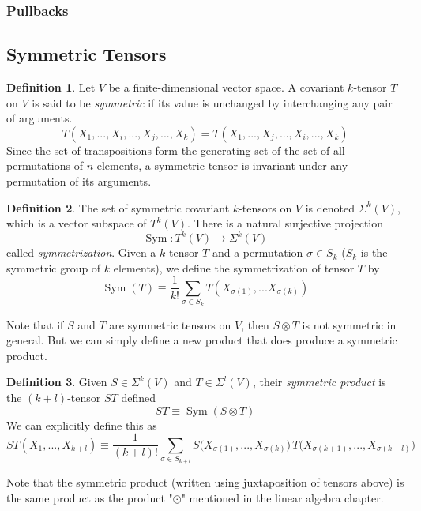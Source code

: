 \documentclass{article}
\DeclareMathOperator{\Sym}{Sym}
\theoremstyle{remark}
\theoremstyle{definition}
\newtheorem{definition}{Definition}[section]
\begin{document}
    \subsubsection{Pullbacks}

  \subsection{Symmetric Tensors}
    \begin{definition}
    Let $V$ be a finite-dimensional vector space. A covariant $k$-tensor $T$ on $V$ is said to be \textit{symmetric} if its value is unchanged by interchanging any pair of arguments. 
    \[T(X_1,..., X_i, ..., X_j, ..., X_k) = T(X_1,..., X_j, ..., X_i, ..., X_k)\]
    Since the set of transpositions form the generating set of the set of all permutations of $n$ elements, a symmetric tensor is invariant under any permutation of its arguments. 
    \end{definition}

    \begin{definition}
    The set of symmetric covariant $k$-tensors on $V$ is denoted $\Sigma^k (V)$, which is a vector subspace of $T^k (V)$. There is a natural surjective projection 
    \[\Sym: T^k (V) \longrightarrow \Sigma^k (V)\]
    called \textit{symmetrization}. Given a $k$-tensor $T$ and a permutation $\sigma \in S_k$ ($S_k$ is the symmetric group of $k$ elements), we define the symmetrization of tensor $T$ by
    \[\Sym(T) \equiv \frac{1}{k!} \sum_{\sigma \in S_k} T (X_{\sigma(1)}, ... X_{\sigma(k)})\]
    \end{definition}

    Note that if $S$ and $T$ are symmetric tensors on $V$, then $S \otimes T$ is not symmetric in general. But we can simply define a new product that does produce a symmetric product. 

    \begin{definition}
    Given $S \in \Sigma^k (V)$ and $T \in \Sigma^l (V)$, their \textit{symmetric product} is the $(k+l)$-tensor $ST$ defined
    \[S T \equiv \Sym(S \otimes T)\]
    We can explicitly define this as 
    \[ST(X_1, ..., X_{k+l}) \equiv \frac{1}{(k+l)!} \sum_{\sigma \in S_{k+l}} S\big(X_{\sigma(1)}, ..., X_{\sigma(k)} \big)\, T\big( X_{\sigma(k+1)}, ..., X_{\sigma(k+l)} \big)\]
    \end{definition}

    Note that the symmetric product (written using juxtaposition of tensors above) is the same product as the product "$\odot$" mentioned in the linear algebra chapter.  
\end{document}
